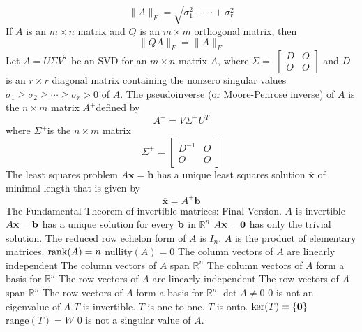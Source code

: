 \documentclass{article}
\begin{document}
\begin{outline}
        \[\|A\|_{F}=\sqrt{\sigma_{1}^{2}+\cdots+\sigma_{r}^{2}}\]
        \1 If $A$ is an $m \times n$ matrix and $Q$ is an $m \times m$ orthogonal matrix, then
        \[\|Q A\|_{F}=\|A\|_{F}\]
        \1 Let $A=U \Sigma V^{T}$ be an SVD for an $m \times n$ matrix $A$, where $\Sigma=$ $\left[\begin{array}{ll}D & O \\ O & O\end{array}\right]$ and $D$ is an $r \times r$ diagonal matrix containing the nonzero singular values $\sigma_{1} \geq \sigma_{2} \geq \cdots \geq \sigma_{r}>0$ of $A$. The pseudoinverse (or Moore-Penrose inverse) of $A$ is the $n \times m$ matrix $A^{+}$defined by
        \[A^{+}=V \Sigma^{+} U^{T}\]
        where $\Sigma^{+}$is the $n \times m$ matrix \[\Sigma^{+}=\left[\begin{array}{cc}
        D^{-1} & O \\
        O & O
        \end{array}\right]\]
        \1 The least squares problem $A \mathbf{x}=\mathbf{b}$ has a unique least squares solution $\overline{\mathbf{x}}$ of minimal length that is given by \[\overline{\mathbf{x}}=A^{+} \mathbf{b}\]
        \1 The Fundamental Theorem of invertible matrices: Final Version. 
            \2 $A$ is invertible
            \2 $A\vb x=\vb b$ has a unique solution for every \(\vb b\) in \(\mathbb R^n\)
            \2 \(A\vb x=\vb 0\) has only the trivial solution. 
            \2 The reduced row echelon form of $A$ is \(I_n\). 
            \2 $A$ is the product of elementary matrices. 
            \2 \(\rank (A)=n\)
            \2 nullity\((A)=0\)
            \2 The column vectors of $A$ are linearly independent
            \2 The column vectors of $A$ span \(\mathbb R^n\)
            \2 The column vectors of $A$ form a basis for \(\mathbb R^n\)
            \2 The row vectors of $A$ are linearly independent
            \2 The row vectors of $A$ span \(\mathbb R^n\)
            \2 The row vectors of $A$ form a basis for \(\mathbb R^n\)
            \2 \(\det A\neq 0\)
            \2 $0$ is not an eigenvalue of $A$
            \2 $T$ is invertible. 
            \2 $T$ is one-to-one. 
            \2 $T$ is onto. 
            \2 \(\text{ker}(T)=\{\vb 0\}\)
            \2 \(\text{range}(T)=W\)
            \2 $0$ is not a singular value of $A$. 

    \end{outline}
\end{document}
